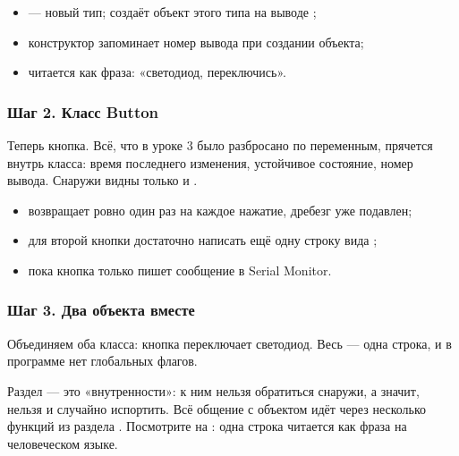
\begin{itemize}[leftmargin=*]
  \item {} --- новый тип;  создаёт объект этого типа на выводе ;
  \item конструктор  запоминает номер вывода при создании объекта;
  \item {} читается как фраза: «светодиод, переключись».
\end{itemize}

\subsubsection{Шаг 2. Класс Button}

Теперь кнопка. Всё, что в уроке 3 было разбросано по переменным, прячется внутрь класса: время последнего
изменения, устойчивое состояние, номер вывода. Снаружи видны только  и .


\begin{itemize}[leftmargin=*]
  \item {} возвращает  ровно один раз на каждое нажатие, дребезг уже подавлен;
  \item для второй кнопки достаточно написать ещё одну строку вида ;
  \item пока кнопка только пишет сообщение в Serial Monitor.
\end{itemize}

\subsubsection{Шаг 3. Два объекта вместе}

Объединяем оба класса: кнопка переключает светодиод. Весь  --- одна строка, и в программе нет
глобальных флагов.


Раздел  --- это «внутренности»: к ним нельзя обратиться снаружи, а значит, нельзя и
случайно испортить. Всё общение с объектом идёт через несколько функций из раздела .
Посмотрите на : одна строка читается как фраза на человеческом языке.

